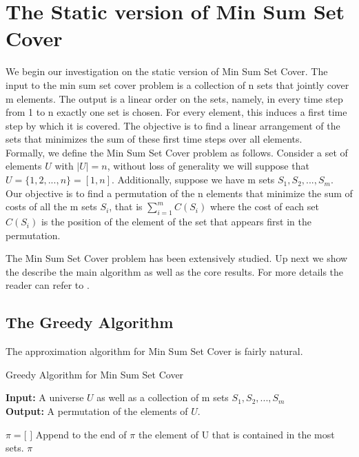\section{The Static version of Min Sum Set Cover}

We begin our investigation on the static version of Min Sum Set Cover. The input to the min sum set cover problem is a collection of n sets that jointly cover m elements. The output is a linear order on the sets, namely, in every time step from 1 to n exactly one set is chosen. For every element, this induces a first time step by which it is covered. The objective is to find a linear arrangement of the sets that minimizes the sum of these first time steps over all elements. \\

Formally, we define the Min Sum Set Cover problem as follows. Consider a set of elements $U$ with $|U|=n$, without loss of generality we will suppose that $U = \{ 1, 2, ..., n \} = [ 1, n ]$. Additionally, suppose we have m sets $S_1, S_2, ..., S_m$. Our objective is to find a permutation of the n elements that minimize the sum of costs of all the m sets $S_i$, that is $\sum_{i=1}^m C( S_i )$ where the cost of each set $C(S_i)$ is the position of the element of the set that appears first in the permutation.

The Min Sum Set Cover problem has been extensively studied. Up next we show the describe the main algorithm as well as the core results. For more details the reader can refer to \cite{FLT04}.

\subsection{The Greedy Algorithm}

The approximation algorithm for Min Sum Set Cover is fairly natural.

\begin{algorithm}[ht]
  \caption{Greedy Algorithm for Min Sum Set Cover}\label{alg:mssc}
  \textbf{Input:} A universe $U$ as well as a collection of m sets $S_1, S_2, ..., S_m$\\
  \textbf{Output:} A permutation of the elements of $U$.

 \begin{algorithmic}[1]
    \STATE $\pi = \text{[ ]}$
        \STATE Append to the end of $\pi$ the element of U that is contained in the most sets.
    \ENDWHILE
    \RETURN $\pi$
  \end{algorithmic}
\end{algorithm}

